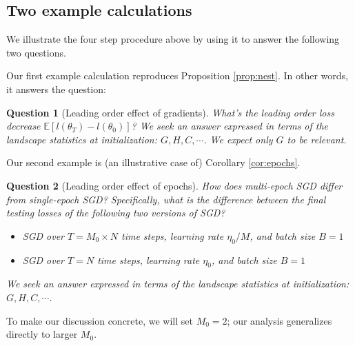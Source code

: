 \documentclass[anon,12pt]{colt2021} %
\newtheorem{quest}{Question}
\newcommand{\expc}{\mathbb{E}}
\begin{document}
        \subsection{Two example calculations}\label{appendix:example}
            We illustrate the four step procedure above by using it to 
            answer the following two questions.

                Our first example calculation reproduces Proposition \ref{prop:nest}.
                In other words, it answers the question:
                \begin{quest}[Leading order effect of gradients]\label{qst:grad}
                    What's the leading order loss decrease
                    $\expc[l(\theta_T)-l(\theta_0)]$?
                    We seek an answer expressed in terms of the landscape
                    statistics at initialization: $G,H,C, \cdots$.  We expect
                    only $G$ to be relevant. 
                \end{quest}

                Our second example is (an illustrative case of)
                Corollary \ref{cor:epochs}.
                \begin{quest}[Leading order effect of epochs]\label{qst:multi}
                    How does multi-epoch SGD differ from single-epoch SGD?
                    Specifically, what is the difference between the final
                    testing losses of the following two versions of SGD?
                    \begin{itemize}
                        \item SGD over $T=M_0 \times N$ time steps, learning rate $\eta_0/M$, and
                            batch size $B=1$
                        \item SGD over $T=N$ time steps, learning rate $\eta_0$, and batch size $B=1$
                    \end{itemize}
                    We seek an answer expressed in terms of the landscape statistics
                    at initialization: $G,H,C, \cdots$.
                \end{quest}
                To make our discussion concrete, we will set $M_0=2$; our analysis 
                generalizes directly to larger $M_0$.
\end{document}
